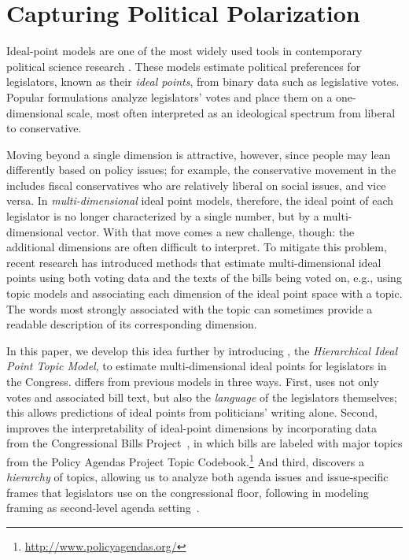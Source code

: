 \section{Capturing Political Polarization}
\label{sec:c6_intro}

Ideal-point models are one of the most widely used tools in
contemporary political science research \cite{Poole:Book07:ideology}.
These models estimate political preferences for legislators, known as
their \emph{ideal points}, from binary data such as legislative votes.
Popular formulations analyze legislators' votes and place them on a
one-dimensional scale, most often interpreted as an ideological
spectrum from liberal to conservative.

Moving beyond a single dimension is attractive, however, since people
may lean differently based on policy issues; for example, the
conservative movement in the \us{} includes fiscal conservatives
who are relatively liberal on social issues, and vice versa. In
\textit{multi-dimensional} ideal point models, therefore, the ideal
point of each legislator is no longer characterized by a single
number, but by a multi-dimensional
vector. With that move comes a new challenge, though: the additional
dimensions are often difficult to interpret. To mitigate this problem,
recent research has introduced methods that estimate multi-dimensional
ideal points using both voting data and the texts of the bills being
voted on, e.g., using topic models and associating each dimension of
the ideal point space with a topic. The words most strongly associated with the topic can sometimes
provide a readable description of its corresponding dimension.

In this paper, we develop this idea further by introducing \name{},
the \textit{Hierarchical Ideal Point Topic Model}, to estimate
multi-dimensional ideal points for legislators in the \us{}
Congress. \name{} differs from previous models in three ways. First,
\name{} uses not only votes and associated bill text, but also the
\emph{language} of the legislators themselves; this allows predictions
of ideal points from politicians' writing alone. Second, \name{}
improves the interpretability of ideal-point dimensions by
incorporating data from the Congressional Bills Project~\cite{CBP}, in
which bills are labeled with major topics from the Policy
Agendas Project Topic Codebook.\footnote{\url{http://www.policyagendas.org/}} And third,
\name{} discovers a \emph{hierarchy} of topics, allowing us to analyze
both agenda issues and issue-specific frames that legislators use on
the congressional floor, following  in modeling
framing as second-level agenda setting~\cite{McCombs:JS05}.

